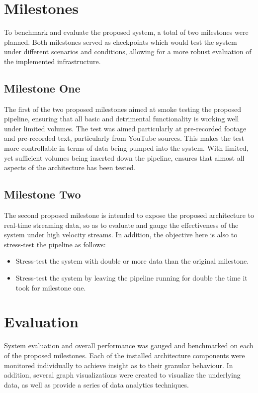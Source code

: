 \documentclass[10pt,conference]{IEEEtran}
\begin{document}
\section{Milestones}
To benchmark and evaluate the proposed system, a total of two milestones were planned. Both milestones served as checkpoints which would test the system under different scenarios and conditions, allowing for a more robust evaluation of the implemented infrastructure.

\subsection{Milestone One}
The first of the two proposed milestones aimed at smoke testing the proposed pipeline, ensuring that all basic and detrimental functionality is working well under limited volumes. The test was aimed particularly at pre-recorded footage and pre-recorded text, particularly from YouTube sources. This makes the test more controllable in terms of data being pumped into the system. With limited, yet sufficient volumes being inserted down the pipeline, ensures that almost all aspects of the architecture has been tested.

\subsection{Milestone Two}
The second proposed milestone is intended to expose the proposed architecture to real-time streaming data, so as to evaluate and gauge the effectiveness of the system under high velocity streams. In addition, the objective here is also to stress-test the pipeline as follows:
\begin{itemize}
    \item Stress-test the system with double or more data than the original milestone.
    \item Stress-test the system by leaving the pipeline running for double the time it took for milestone one.
\end{itemize}

\section{Evaluation}
System evaluation and overall performance was gauged and benchmarked on each of the proposed milestones. Each of the installed architecture components were monitored individually to achieve insight as to their granular behaviour. In addition, several graph visualizations were created to visualize the underlying data, as well as provide a series of data analytics techniques.
\end{document}
